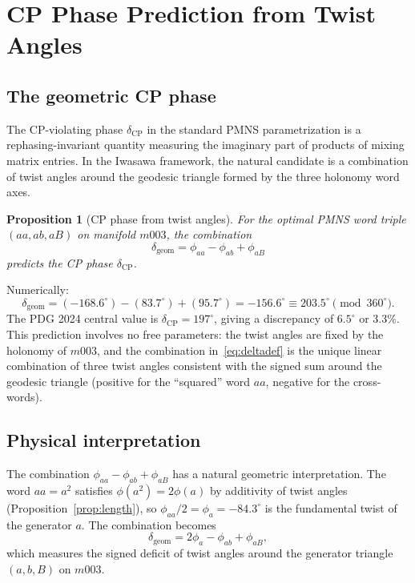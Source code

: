 \documentclass[11pt,a4paper]{article}
\newtheorem{proposition}{Proposition}
\begin{document}
\section{CP Phase Prediction from Twist Angles}
\label{sec:prediction}

\subsection{The geometric CP phase}
\label{subsec:geomcp}

The CP-violating phase $\delta_{\mathrm{CP}}$ in the standard PMNS
parametrization is a rephasing-invariant quantity measuring the
imaginary part of products of mixing matrix entries.  In the Iwasawa
framework, the natural candidate is a combination of twist angles
around the geodesic triangle formed by the three holonomy word axes.

\begin{proposition}[CP phase from twist angles]
\label{prop:cpphase}
For the optimal PMNS word triple $(aa, ab, aB)$ on manifold $m003$,
the combination
\begin{equation}
  \delta_{\mathrm{geom}} = \phi_{aa} - \phi_{ab} + \phi_{aB}
  \label{eq:deltadef}
\end{equation}
predicts the CP phase $\delta_{\mathrm{CP}}$.
\end{proposition}

Numerically:
\begin{equation}
  \delta_{\mathrm{geom}}
  = (-168.6^\circ) - (83.7^\circ) + (95.7^\circ)
  = -156.6^\circ \equiv 203.5^\circ \pmod{360^\circ}.
  \label{eq:deltanum}
\end{equation}
The PDG 2024 central value is $\delta_{\mathrm{CP}} = 197^\circ$,
giving a discrepancy of $6.5^\circ$ or 3.3\%.  This prediction
involves no free parameters: the twist angles are fixed by the
holonomy of $m003$, and the combination in~\eqref{eq:deltadef} is
the unique linear combination of three twist angles consistent with
the signed sum around the geodesic triangle (positive for the
``squared'' word $aa$, negative for the cross-words).

\subsection{Physical interpretation}
\label{subsec:interp}

The combination $\phi_{aa} - \phi_{ab} + \phi_{aB}$ has a natural
geometric interpretation.  The word $aa = a^2$ satisfies
$\phi(a^2) = 2\phi(a)$ by additivity of twist angles
(Proposition~\ref{prop:length}), so
$\phi_{aa}/2 = \phi_a = -84.3^\circ$ is the fundamental twist of the
generator $a$.  The combination becomes
\begin{equation}
  \delta_{\mathrm{geom}} = 2\phi_a - \phi_{ab} + \phi_{aB},
  \label{eq:deltainterp}
\end{equation}
which measures the signed deficit of twist angles around the generator
triangle $(a, b, B)$ on $m003$.
\end{document}

